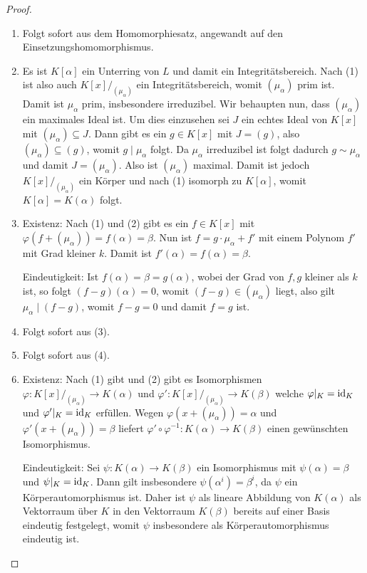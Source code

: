 \begin{proof}{\ }
    \begin{enumerate}
        \item Folgt sofort aus dem Homomorphiesatz, angewandt auf den Einsetzungshomomorphismus.
        
        \item Es ist $K[\alpha]$ ein Unterring von $L$ und damit ein Integritätsbereich. Nach (1) ist also auch $K[x]/_{(\mu_\alpha)}$ ein Integritätsbereich, womit $(\mu_\alpha)$ prim ist. Damit ist $\mu_\alpha$ prim, insbesondere irreduzibel. Wir behaupten nun, dass $(\mu_\alpha)$ ein maximales Ideal ist. Um dies einzusehen sei $J$ ein echtes Ideal von $K[x]$ mit $(\mu_\alpha) \subseteq J$. Dann gibt es ein $g \in K[x]$ mit $J = (g)$, also $(\mu_\alpha) \subseteq (g)$, womit $g \mid \mu_\alpha$ folgt. Da $\mu_\alpha$ irreduzibel ist folgt dadurch $g \sim \mu_\alpha$ und damit $J = (\mu_\alpha)$. Also ist $(\mu_\alpha)$ maximal. Damit ist jedoch $K[x]/_{(\mu_\alpha)}$ ein Körper und nach (1) isomorph zu $K[\alpha]$, womit $K[\alpha] = K(\alpha)$ folgt.
        
        \item Existenz: Nach (1) und (2) gibt es ein $f \in K[x]$ mit $\varphi(f + (\mu_\alpha)) = f(\alpha) = \beta$. Nun ist $f = g \cdot \mu_\alpha + f'$ mit einem Polynom $f'$ mit Grad kleiner $k$. Damit ist $f'(\alpha) = f(\alpha) = \beta$.
        
        Eindeutigkeit: Ist $f(\alpha) = \beta = g(\alpha)$, wobei der Grad von $f, g$ kleiner als $k$ ist, so folgt $(f-g)(\alpha) = 0$, womit $(f-g) \in (\mu_\alpha)$ liegt, also gilt $\mu_\alpha \mid (f-g)$, womit $f-g=0$ und damit $f=g$ ist.

        \item Folgt sofort aus (3).
        
        \item Folgt sofort aus (4).
        
        \item {Existenz:} Nach (1) gibt und (2) gibt es Isomorphismen
        $\varphi:K[x]/_{(\mu_\alpha)}\to K(\alpha)$ und $\varphi':K[x]/_{(\mu_\alpha)}\to K(\beta)$
        welche $\varphi\vert_K=\operatorname{id}_K$ und $\varphi'\vert_K=\operatorname{id}_K$ erfüllen. Wegen $\varphi(x+(\mu_\alpha))=\alpha$
        und $\varphi'(x+(\mu_\alpha))=\beta$ liefert $\varphi'\circ\varphi^{-1}:K(\alpha)\to K(\beta)$
        einen gewünschten Isomorphismus.

        {Eindeutigkeit:} Sei $\psi:K(\alpha)\to K(\beta)$ ein Isomorphismus mit $\psi(\alpha)=\beta$
        und $\psi\vert_K=\operatorname{id}_K$. Dann gilt insbesondere $\psi(\alpha^i)=\beta^i$, da $\psi$ ein Körperautomorphismus
        ist. Daher ist $\psi$ als lineare Abbildung von $K(\alpha)$ als Vektorraum über $K$ in den Vektorraum $K(\beta)$
        bereits auf einer Basis eindeutig festgelegt, womit $\psi$ insbesondere als Körperautomorphismus eindeutig ist.
    \end{enumerate}
\end{proof}

